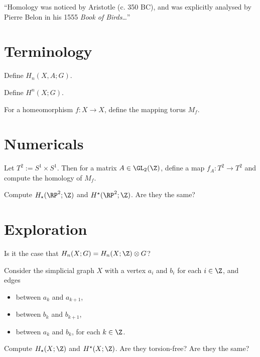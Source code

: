 \documentclass{homework}
\author{Jim Fowler}
\begin{document}
\maketitle

\begin{inspiration}
``Homology was noticed by Aristotle (c. 350 BC), and was explicitly analysed by Pierre Belon in his 1555 \textit{Book of Birds}\ldots''
\end{inspiration}

\section{Terminology}

\begin{problem}
  Define $H_n(X,A;G)$.
\end{problem}

\begin{problem}
 Define  
  $H^n(X;G)$.
\end{problem}

\begin{problem}
  For a homeomorphism $f : X \to X$, define the mapping torus $M_f$.
\end{problem}

\section{Numericals}

\begin{problem} Let $T^2 := S^1 \times S^1$.  Then for a matrix $A \in
\GL_2(\Z)$, define a map $f_A : T^2 \to T^2$ and compute the homology
of $M_f$.
\end{problem}

\begin{problem}
  Compute $H_\star(\RP^2;\Z)$ and $H^\star(\RP^2;\Z)$.  Are they the same?
\end{problem}

\section{Exploration}

\begin{problem}
  Is it the case that $H_n(X;G) = H_n(X;\Z) \otimes G$?
\end{problem}

\begin{problem}
  Consider the simplicial graph $X$ with a vertex $a_i$ and $b_i$ for each $i \in \Z$, and edges
  \begin{itemize}
  \item between $a_k$ and $a_{k+1}$,
  \item between $b_k$ and $b_{k+1}$,
  \item between $a_k$ and $b_k$, for each $k \in \Z$.
  \end{itemize} Compute $H_\star(X;\Z)$ and $H^\star(X;\Z)$.  Are they
torsion-free?  Are they the same?
\end{problem}
\end{document}
